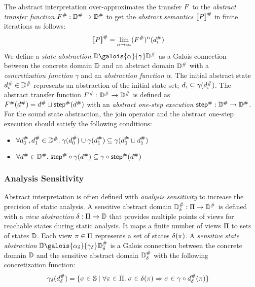 The abstract interpretation over-approximates the transfer $F$ to the
\textit{abstract transfer function} ${F}^{\#}: {\mathbb{D}}^{\#} \rightarrow {\mathbb{D}}^{\#}$
to get the \textit{abstract semantics} ${[\![{P}]\!]}^{\#}$ in finite iterations as
follows:
\[
    {[\![{P}]\!]}^{\#} = \underset{n \rightarrow
    \infty}{\lim}{({F}^{\#})^n({d}^{\#}_\iota)}\\
\]
We define a \textit{state abstraction} $\dom \galois{\alpha}{\gamma} \absdom$ as
a Galois connection between the concrete domain $\mathbb{D}$ and an abstract domain
${\mathbb{D}}^{\#}$ with a \textit{concretization function} $\gamma$ and an
\textit{abstraction function} $\alpha$.  The initial abstract state ${d}^{\#}_\iota
\in {\mathbb{D}}^{\#}$ represents an abstraction of the initial state set; $d_\iota
\subseteq \gamma({d}^{\#}_\iota)$.  The abstract transfer function ${F}^{\#}:
{\mathbb{D}}^{\#} \rightarrow {\mathbb{D}}^{\#}$ is defined as ${F}^{\#}({d}^{\#}) = {d}^{\#}
\sqcup {\textsf{step}}^{\#}({d}^{\#})$ with an \textit{abstract one-step execution}
${\textsf{step}}^{\#}: {\mathbb{D}}^{\#} \rightarrow {\mathbb{D}}^{\#}$.  For the sound state abstraction, the
join operator and the abstract one-step execution should satisfy the following
conditions:
\begin{itemize}
  \item $\forall {d}^{\#}_0, {d}^{\#}_1 \in {\mathbb{D}}^{\#}. \; \gamma({d}^{\#}_0) \cup
    \gamma({d}^{\#}_1) \subseteq \gamma({d}^{\#}_0 \sqcup {d}^{\#}_1)$
  \item $\forall {d}^{\#} \in {\mathbb{D}}^{\#}. \; {\textsf{step}}^{\#} \circ \gamma({d}^{\#}) \subseteq
    \gamma \circ {\textsf{step}}^{\#}({d}^{\#})$
\end{itemize}


\subsubsection{Analysis Sensitivity}

Abstract interpretation is often defined with \textit{analysis sensitivity} to
increase the precision of static analysis.  A sensitive abstract domain
${\mathbb{D}}^{\#}_\delta: \Pi \rightarrow {\mathbb{D}}^{\#}$ is defined with a \textit{view
abstraction} $\delta: \Pi \rightarrow \mathbb{D}$ that provides multiple points
of views for reachable states during static analysis.  It maps a finite number
of views $\Pi$ to sets of states $\mathbb{D}$. Each view $\pi \in \Pi$
represents a set of states $\delta(\pi)$.
A \textit{sensitive state abstraction} $\dom
\galois{\alpha_\viewmap}{\gamma_\viewmap} \sabsdom$ is a Galois connection between
the concrete domain $\mathbb{D}$ and the sensitive abstract domain ${\mathbb{D}}^{\#}_\delta$ with the
following concretization function:
\[
  \gamma_\delta({d}^{\#}_\delta) = \{ \sigma \in \mathbb{S} \mid \forall \pi \in \Pi.
  \; \sigma \in \delta(\pi) \Rightarrow \sigma \in \gamma \circ {d}^{\#}_\delta(\pi) \}
\]

